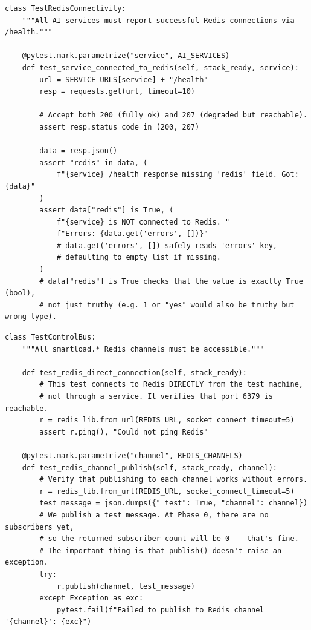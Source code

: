 \documentclass[12pt, a4paper]{article}
\begin{document}
\begin{lstlisting}[style=python, caption={test\_pipeline\_health.py --- Layers 3 \& 4: Connectivity}]
class TestRedisConnectivity:
    """All AI services must report successful Redis connections via /health."""

    @pytest.mark.parametrize("service", AI_SERVICES)
    def test_service_connected_to_redis(self, stack_ready, service):
        url = SERVICE_URLS[service] + "/health"
        resp = requests.get(url, timeout=10)

        # Accept both 200 (fully ok) and 207 (degraded but reachable).
        assert resp.status_code in (200, 207)

        data = resp.json()
        assert "redis" in data, (
            f"{service} /health response missing 'redis' field. Got: {data}"
        )
        assert data["redis"] is True, (
            f"{service} is NOT connected to Redis. "
            f"Errors: {data.get('errors', [])}"
            # data.get('errors', []) safely reads 'errors' key,
            # defaulting to empty list if missing.
        )
        # data["redis"] is True checks that the value is exactly True (bool),
        # not just truthy (e.g. 1 or "yes" would also be truthy but wrong type).
\end{lstlisting}

\begin{lstlisting}[style=python, caption={test\_pipeline\_health.py --- Layer 5: Control Bus Channels}]
class TestControlBus:
    """All smartload.* Redis channels must be accessible."""

    def test_redis_direct_connection(self, stack_ready):
        # This test connects to Redis DIRECTLY from the test machine,
        # not through a service. It verifies that port 6379 is reachable.
        r = redis_lib.from_url(REDIS_URL, socket_connect_timeout=5)
        assert r.ping(), "Could not ping Redis"

    @pytest.mark.parametrize("channel", REDIS_CHANNELS)
    def test_redis_channel_publish(self, stack_ready, channel):
        # Verify that publishing to each channel works without errors.
        r = redis_lib.from_url(REDIS_URL, socket_connect_timeout=5)
        test_message = json.dumps({"_test": True, "channel": channel})
        # We publish a test message. At Phase 0, there are no subscribers yet,
        # so the returned subscriber count will be 0 -- that's fine.
        # The important thing is that publish() doesn't raise an exception.
        try:
            r.publish(channel, test_message)
        except Exception as exc:
            pytest.fail(f"Failed to publish to Redis channel '{channel}': {exc}")
\end{lstlisting}
\end{document}
